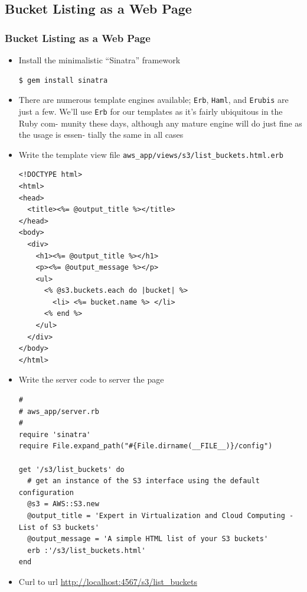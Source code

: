 \documentclass{beamer}
\begin{document}
\begin{frame}
\subsection{Bucket Listing as a Web Page}
\frametitle{Bucket Listing as a Web Page}
\begin{itemize}
\item Install the minimalistic ``Sinatra'' framework
\lstset{language=shell}
\begin{lstlisting}[escapechar=!]
$ gem install sinatra
\end{lstlisting}


\item There are numerous template engines available; \texttt{Erb}, \texttt{Haml}, and \texttt{Erubis} are
just a few. We’ll use \texttt{Erb} for our templates as it’s fairly ubiquitous in the Ruby com-
munity these days, although any mature engine will do just fine as the usage is essen-
tially the same in all cases

\item Write the template view file \texttt{aws\_app/views/s3/list\_buckets.html.erb}

\lstset{language=Ruby, style=eclipse}
\begin{lstlisting}[escapechar=!]
<!DOCTYPE html>
<html>
<head>
  <title><%= @output_title %></title>
</head>
<body>
  <div>
    <h1><%= @output_title %></h1>
    <p><%= @output_message %></p>
    <ul>
      <% @s3.buckets.each do |bucket| %>
        <li> <%= bucket.name %> </li>
      <% end %>
    </ul>
  </div>
</body>
</html>
\end{lstlisting}


\item Write the server code to server the page
\lstset{language=Ruby, style=eclipse}
\begin{lstlisting}[escapechar=!]
#
# aws_app/server.rb
#
require 'sinatra'
require File.expand_path("#{File.dirname(__FILE__)}/config")

get '/s3/list_buckets' do
  # get an instance of the S3 interface using the default configuration
  @s3 = AWS::S3.new
  @output_title = 'Expert in Virtualization and Cloud Computing - List of S3 buckets'
  @output_message = 'A simple HTML list of your S3 buckets'
  erb :'/s3/list_buckets.html'
end
\end{lstlisting}

\item Curl to url \url{http://localhost:4567/s3/list_buckets}
\end{itemize}
\end{frame}
\end{document}

